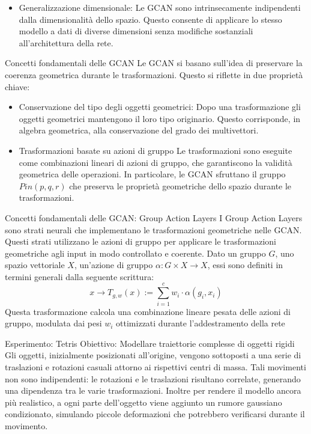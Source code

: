 \begin{frame}
   \begin{itemize}
      \item Generalizzazione dimensionale: 
      Le GCAN sono intrinsecamente indipendenti dalla dimensionalità dello spazio. Questo consente di applicare lo stesso modello a dati di diverse dimensioni senza modifiche sostanziali all’architettura della rete.
   \end{itemize}
\end{frame}

\begin{frame}{Concetti fondamentali delle GCAN}
   Le GCAN si basano sull'idea di preservare la coerenza geometrica durante le trasformazioni. Questo si riflette in due proprietà chiave:
   \begin{itemize}
      \item Conservazione del tipo degli oggetti geometrici:
      Dopo una trasformazione gli oggetti geometrici mantengono il loro tipo originario. Questo corrisponde, in algebra geometrica, alla conservazione del grado dei multivettori.
      \item Trasformazioni basate su azioni di gruppo
      Le trasformazioni sono eseguite come combinazioni lineari di azioni di gruppo, che garantiscono la validità geometrica delle operazioni. In particolare, le GCAN sfruttano il gruppo\(Pin(p,q,r)\) che preserva le proprietà geometriche dello spazio durante le trasformazioni.
   \end{itemize}
\end{frame}

\begin{frame}{Concetti fondamentali delle GCAN: Group Action Layers}
   I Group Action Layers sono strati neurali che implementano le trasformazioni geometriche nelle GCAN. Questi strati utilizzano le azioni di gruppo per applicare le trasformazioni geometriche agli input in modo controllato e coerente.
   Dato un gruppo \(G\), uno spazio vettoriale \(X\), un’azione di gruppo \(\alpha:G\times X \to X\),  essi sono definiti in termini generali dalla seguente scrittura:
   \[
      x \to T_{g,w}(x):=\sum^{c}_{i=1}w_i\cdot\alpha(g_i, x_i) 
   \]
   Questa trasformazione calcola una combinazione lineare pesata delle azioni di gruppo, modulata dai pesi \(w_i\) ottimizzati durante l'addestramento della rete
\end{frame}

\begin{frame}{Esperimento: Tetris}
   Obiettivo: Modellare traiettorie complesse di oggetti rigidi\\
   Gli oggetti, inizialmente posizionati all'origine, vengono sottoposti a una serie di traslazioni e rotazioni casuali attorno ai rispettivi centri di massa.
   Tali movimenti non sono indipendenti: le rotazioni e le traslazioni risultano correlate, generando una dipendenza tra le varie trasformazioni.
   Inoltre per rendere il modello ancora più realistico, a ogni parte dell’oggetto viene aggiunto un rumore gaussiano condizionato, simulando piccole deformazioni che potrebbero verificarsi durante il movimento.
\end{frame}

